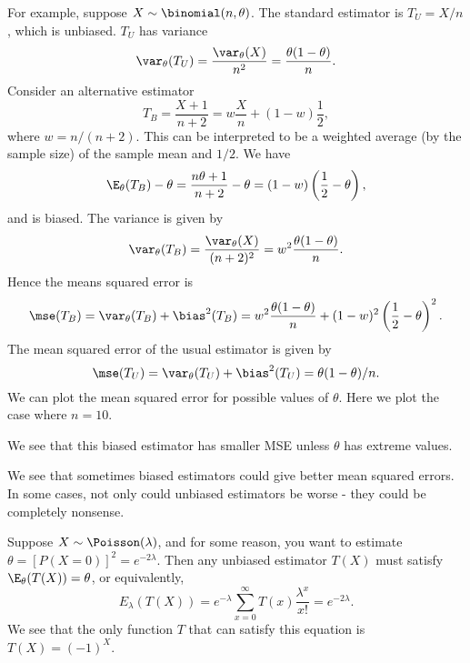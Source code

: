 \documentclass[a4paper]{article}
\begin{document}
For example, suppose $X\sim \binomial(n, \theta)$. The standard estimator is $T_U = X/n$, which is unbiased. $T_U$ has variance
\[
  \var_\theta(T_U) = \frac{\var_\theta(X)}{n^2} = \frac{\theta(1 - \theta)}{n}.
\]
Consider an alternative estimator
\[
  T_B = \frac{X + 1}{n + 2} = w\frac{X}{n} + (1 - w)\frac{1}{2},
\]
where $w = n/(n + 2)$. This can be interpreted to be a weighted average (by the sample size) of the sample mean and $1/2$. We have
\[
  \E_\theta(T_B) - \theta = \frac{n\theta + 1}{n + 2} - \theta = (1 - w)\left(\frac{1}{2} - \theta\right),
\]
and is biased. The variance is given by
\[
  \var_\theta(T_B) = \frac{\var_\theta(X)}{(n + 2)^2} = w^2\frac{\theta(1 - \theta)}{n}.
\]
Hence the means squared error is
\[
  \mse (T_B) = \var_\theta(T_B) + \bias^2(T_B) = w^2\frac{\theta(1 - \theta)}{n} + (1 - w)^2\left(\frac{1}{2} - \theta\right)^2.
\]
The mean squared error of the usual estimator is given by
\[
  \mse (T_U) = \var_\theta(T_U) + \bias^2(T_U) = \theta(1 - \theta)/n.
\]
We can plot the mean squared error for possible values of $\theta$. Here we plot the case where $n = 10$.
\begin{center}
\end{center}
We see that this biased estimator has smaller MSE unless $\theta$ has extreme values.

We see that sometimes biased estimators could give better mean squared errors. In some cases, not only could unbiased estimators be worse - they could be completely nonsense.

Suppose $X\sim \Poisson(\lambda)$, and for some reason, you want to estimate $\theta = [P(X = 0)]^2 = e^{-2\lambda}$. Then any unbiased estimator $T(X)$ must satisfy $\E_\theta(T(X)) = \theta$, or equivalently,
\[
  E_\lambda(T(X)) = e^{-\lambda}\sum_{x = 0}^\infty T(x) \frac{\lambda^x}{x!} = e^{-2\lambda}.
\]
We see that the only function $T$ that can satisfy this equation is $T(X) = (-1)^X$.
\end{document}
